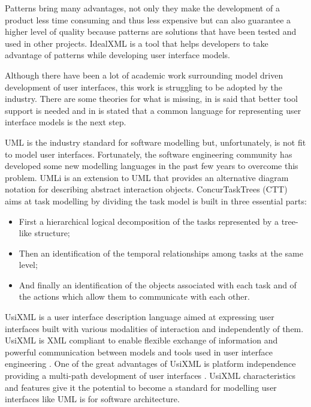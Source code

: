 Patterns bring many advantages, not only they make the development of a product less time consuming and thus less expensive but can also guarantee a higher level of quality because patterns are solutions that have been tested and used in other projects. IdealXML\cite{IdealXml_An_Interaction_Design_Tool, idealxml2} is a tool that helps developers to take advantage of patterns while developing user interface models.

Although there have been a lot of academic work surrounding model driven development of user interfaces, this work is struggling to be adopted by the industry. There are some theories for what is missing, in \cite{molina} is said that better tool support is needed and in \cite{IdealXml_An_Interaction_Design_Tool} is stated that a common language for representing user interface models is the next step.

UML \cite{The_Unified_Modeling_Language_Reference_Manual} is the industry standard for software modelling but, unfortunately, is not fit to model user interfaces. Fortunately, the software engineering community has developed some new modelling languages in the past few years to overcome this problem. UMLi \cite{User_Interface_Modeling_in_UMLi} is an extension to UML that provides an alternative diagram notation for describing abstract interaction objects. ConcurTaskTrees (CTT) \cite{ConcurTaskTrees_A_Diagrammatic_Notation_for_Specifying_Task_Models} aims at task modelling by dividing the task model is built in three essential parts:
\begin{itemize}
\item First a hierarchical logical decomposition of the tasks represented by a tree-like structure;
\item Then an identification of the temporal relationships among tasks at the same level;
\item And finally an identification of the objects associated with each task and of the actions which allow them to communicate with each other.
\end{itemize} 

UsiXML is a user interface description language aimed at expressing user interfaces built with various modalities of interaction and independently of them. UsiXML is XML compliant to enable flexible exchange of information and powerful communication between models and tools used in user interface engineering \cite{UsiXML_USer_Interface_eXtensible_Markup_Language}. One of the great advantages of UsiXML is platform independence providing a multi-path development of user interfaces \cite{UsiXML_a_Language_Supporting_Multi-Path_Development_of_User_Interfaces}. UsiXML characteristics and features give it the potential to become a standard for modelling user interfaces like UML is for software architecture.


